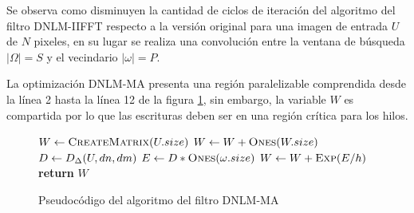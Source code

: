 Se observa como disminuyen la cantidad de ciclos de iteraci\'on del algoritmo del filtro DNLM-IIFFT respecto a la versi\'on original para una imagen de entrada $U$ de $N$ pixeles, en su lugar se realiza una convoluci\'on entre la ventana de b\'usqueda $|\Omega|=S$ y el vecindario $|\omega|=P$. 

La optimizaci\'on DNLM-MA presenta una regi\'on paralelizable comprendida desde la l\'inea 2 hasta la l\'inea 12 de la figura \ref{fig:euclid3}, sin embargo, la variable $W$ es compartida por lo que las escrituras deben ser en una regi\'on cr\'itica para los hilos. 


\begin{figure}[H]

\begin{algorithmic}[1]
\State $W\gets \Call{CreateMatrix}{U.size}$
			\State $W\gets W + \Call{Ones}{W.size}$
		\Else
			\State $D\gets \Call{$D_{\Delta}$}{U,dn,dm}$  
			\State $E\gets D * \Call{Ones}{\omega.size}$ 
			\State $W\gets W + \Call{Exp}{E/h}$ 
		\EndIf
	\EndFor
\EndFor
\State \textbf{return} $W$
\end{algorithmic}
\caption{Pseudoc\'odigo del algoritmo del filtro DNLM-MA}\label{fig:euclid3}
\end{figure}


 

